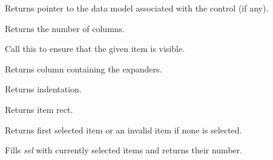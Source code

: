 \label{wxdataviewctrlgetmodel}


Returns pointer to the data model associated with the
control (if any).

\label{wxdataviewctrlgetcolumncount}


Returns the number of columns.

\label{wxdataviewctrlensurevisible}


Call this to ensure that the given item is visible.

\label{wxdataviewctrlgetexpandercolumn}


Returns column containing the expanders.

\label{wxdataviewctrlgetindent}


Returns indentation.

\label{wxdataviewctrlgetitemrect}


Returns item rect.

\label{wxdataviewctrlgetselection}


Returns first selected item or an invalid item if none is selected.

\label{wxdataviewctrlgetselections}


Fills {\it sel} with currently selected items and returns
their number.

\label{wxdataviewctrlhittest}

